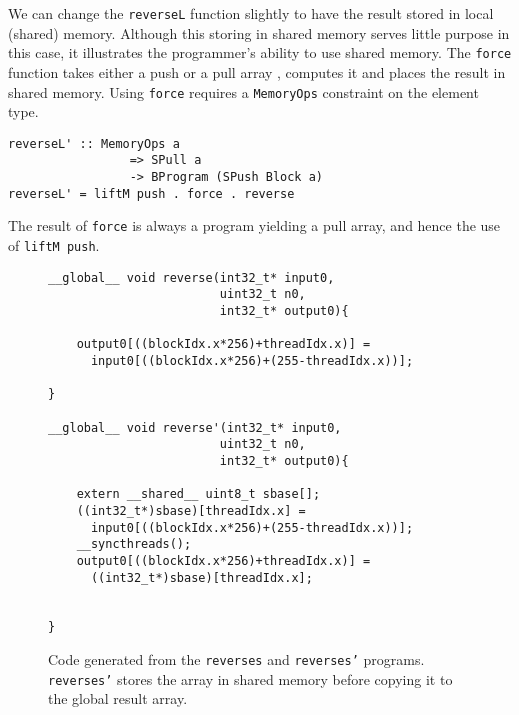 We can change the {\tt reverseL} function slightly to have the result stored 
in local (shared) memory. Although this storing in shared memory serves little purpose in this case, it illustrates the programmer's ability to use shared memory.
The {\tt force} function takes 
either a push or a pull array , computes it and places the result in shared memory. 
Using {\tt force} requires a {\tt MemoryOps} constraint on the element type.


\begin{small}
\begin{verbatim}
reverseL' :: MemoryOps a
                 => SPull a
                 -> BProgram (SPush Block a)
reverseL' = liftM push . force . reverse
\end{verbatim} 
\end{small} 

The result of {\tt force} is always a program yielding a pull array, and hence the 
use of {\tt liftM push}.



\begin{figure} 
\begin{small} 
\begin{verbatim} 
__global__ void reverse(int32_t* input0,
                        uint32_t n0,
                        int32_t* output0){
  
    output0[((blockIdx.x*256)+threadIdx.x)] = 
      input0[((blockIdx.x*256)+(255-threadIdx.x))];
      
}

__global__ void reverse'(int32_t* input0,
                        uint32_t n0,
                        int32_t* output0){
  
    extern __shared__ uint8_t sbase[];
    ((int32_t*)sbase)[threadIdx.x] = 
      input0[((blockIdx.x*256)+(255-threadIdx.x))];
    __syncthreads();
    output0[((blockIdx.x*256)+threadIdx.x)] = 
      ((int32_t*)sbase)[threadIdx.x];
    
  
}

\end{verbatim}
\end{small}
\caption{Code generated from the {\tt reverses} and {\tt reverses'} programs.
 {\tt reverses'} stores the array in shared memory before copying it to the global result array.} 
\label{fig:rev1} 
\end{figure} 

